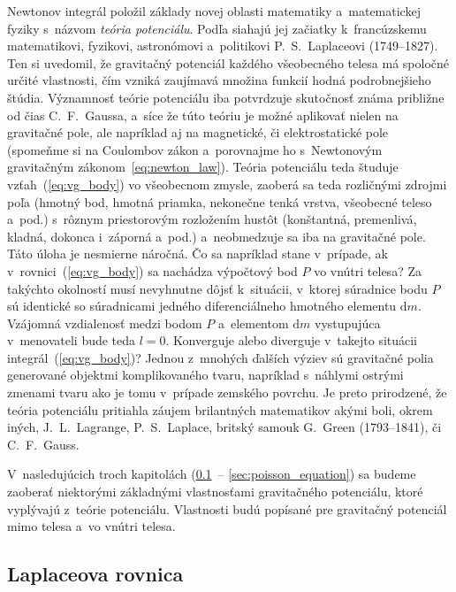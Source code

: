 \documentclass[a4paper, 12pt]{book}
\newcommand{\diff}{\mathrm d}
\begin{document}
Newtonov integrál položil základy novej oblasti matematiky a~matematickej 
fyziky s~názvom \emph{teória potenciálu}.  Podľa \cite{MacMillan1930} siahajú 
jej začiatky k~francúzskemu matematikovi, fyzikovi, astronómovi a~politikovi 
P.~S.~Laplaceovi (1749--1827).  Ten si uvedomil, že gravitačný potenciál 
každého všeobecného telesa má spoločné určité vlastnosti, čím vzniká zaujímavá 
množina funkcií hodná podrobnejšieho štúdia.  Významnosť teórie potenciálu iba 
potvrdzuje skutočnosť známa približne od čias C.~F.~Gaussa, a~síce že túto 
teóriu je možné aplikovať nielen na gravitačné pole, ale  napríklad aj na 
magnetické, či elektrostatické pole (spomeňme si na Coulombov zákon 
a~porovnajme ho s~Newtonovým gravitačným zákonom~\ref{eq:newton_law}).  Teória 
potenciálu teda študuje vzťah~(\ref{eq:vg_body}) vo všeobecnom zmysle, zaoberá 
sa teda rozličnými zdrojmi poľa (hmotný bod, hmotná priamka, nekonečne tenká 
vrstva, všeobecné teleso a~pod.) s~rôznym priestorovým rozložením hustôt 
(konštantná, premenlivá, kladná, dokonca i~záporná a~pod.) a~neobmedzuje sa iba 
na gravitačné pole.  Táto úloha je nesmierne náročná.  Čo sa napríklad stane 
v~prípade, ak v~rovnici~(\ref{eq:vg_body}) sa nachádza výpočtový bod $P$ vo 
vnútri telesa?  Za takýchto okolností musí nevyhnutne dôjsť k~situácii, 
v~ktorej súradnice bodu $P$ sú identické so súradnicami jedného diferenciálneho 
hmotného elementu $\diff m$.  Vzájomná vzdialenosť medzi bodom $P$ a~elementom 
$\diff m$ vystupujúca v~menovateli bude teda $l = 0$.  Konverguje alebo 
diverguje v~takejto situácii integrál~(\ref{eq:vg_body})?  Jednou z~mnohých 
ďalších výziev sú gravitačné polia generované objektmi komplikovaného tvaru, 
napríklad s~náhlymi ostrými zmenami tvaru ako je tomu v~prípade zemského 
povrchu.  Je preto prirodzené, že teória potenciálu pritiahla záujem 
brilantných matematikov akými boli, okrem iných, J.~L.~Lagrange, P.~S.~Laplace, 
britský samouk G.~Green (1793--1841), či C.~F.~Gauss.

V~nasledujúcich troch kapitolách (\ref{sec:laplace_equation}~-- 
\ref{sec:poisson_equation}) sa budeme zaoberať niektorými základnými 
vlastnosťami gravitačného potenciálu, ktoré vyplývajú z~teórie potenciálu.  
Vlastnosti budú popísané pre gravitačný potenciál mimo telesa a~vo vnútri 
telesa.





\subsection{Laplaceova rovnica}
\label{sec:laplace_equation}
\end{document}
